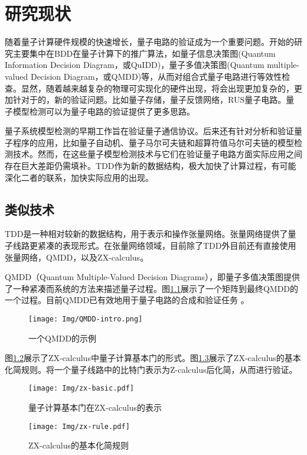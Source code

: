\chapter{研究现状}
随着量子计算硬件规模的快速增长，量子电路的验证成为一个重要问题。开始的研究主要集中在BDD在量子计算下的推广算法，如量子信息决策图(Quantum Information Decision Diagram，或QuIDD)\citep{Viamontes_2003}，量子多值决策图(Quantum multiple-valued Decision Diagram，或QMDD)\citep{Seiter_2013}等，从而对组合式量子电路进行等效性检查。显然，随着越来越复杂的物理可实现化的硬件出现，将会出现更加复杂的，更加针对于的，新的验证问题。比如量子存储\citep{Kerckhoff_2010}，量子反馈网络\citep{Gough_2008}，RUS量子电路\citep{Bocharov_2015}。量子模型检测可以为量子电路的验证提供了更多思路。

量子系统模型检测的早期工作旨在验证量子通信协议\citep{Gay,BALTAZAR_2008,davidson2012model}。后来还有针对分析和验证量子程序的应用\citep{ying2016foundations}，比如量子自动机\citep{ying2014model}、量子马尔可夫链\citep{Ying_2013}和超算符值马尔可夫链\citep{feng2013model}的模型检测技术。然而，在这些量子模型检测技术与它们在验证量子电路方面实际应用之间存在巨大差距仍需填补。TDD作为新的数据结构，极大加快了计算过程，有可能深化二者的联系，加快实际应用的出现。
\section{类似技术}
TDD是一种相对较新的数据结构，用于表示和操作张量网络。张量网络提供了量子线路更紧凑的表现形式。在张量网络领域，目前除了TDD外目前还有直接使用张量网络，QMDD\citep{1623982}，以及ZX-calculus\citep{van2020zx}。

QMDD（Quantum Multiple-Valued Decision Diagrams），即量子多值决策图提供了一种紧凑而系统的方法来描述量子过程。图\ref{fig:qmdd-basic}展示了一个矩阵到最终QMDD的一个过程。目前QMDD已有效地用于量子电路的合成\citep{niemann2020advanced}和验证任务
\citep{burgholzer2020verifying,burgholzer2020advanced}。
\begin{figure}[!htbp]
    \centering
    \texttt{[image: Img/QMDD-intro.png]}
    \caption{一个QMDD的示例}
    \label{fig:qmdd-basic}
\end{figure}

图\ref{fig:zx-basic}展示了ZX-calculus中量子计算基本门的形式。图\ref{fig:zx-rule}展示了ZX-calculus的基本化简规则。将一个量子线路中的比特门表示为Z-calculus后化简，从而进行验证。

\begin{figure}[!htbp]
    \centering
    \texttt{[image: Img/zx-basic.pdf]}
    \caption{量子计算基本门在ZX-calculus的表示}
    \label{fig:zx-basic}
\end{figure}
\begin{figure}[!htbp]
    \centering
    \texttt{[image: Img/zx-rule.pdf]}
    \caption{ZX-calculus的基本化简规则}
    \label{fig:zx-rule}
\end{figure}
 
